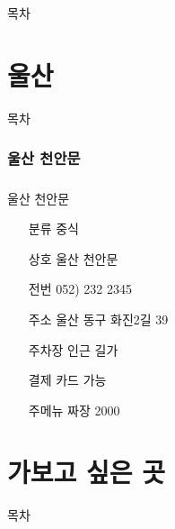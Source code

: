 \documentclass[aspectratio=1610,17pt,xcolor=pdftex,dvipsnames,table,handout]{beamer}
\begin{document}
\label{part3} 	%

		\begin{frame} [plain]{목차}
		\tableofcontents%
		\end{frame}



		\part{ 울산 }
		\frame{\partpage}
		
\label{part4} 	%

		\begin{frame} [plain]{목차}
		\tableofcontents%
		\end{frame}

		\section{ 울산 천안문 }
		\begin{frame} [t,plain]
		\frametitle{ }
			\begin{block} { 울산 천안문 }
			\setlength{\leftmargini}{4em}			
			\begin{itemize}
				\item [분류] 중식
				\item [상호] 울산 천안문
				\item [전번] 052) 232 2345
				\item [주소] 울산 동구 화진2길 39
				\item [주차장]  인근 길가
				\item [결제] 카드 가능
				\item [주메뉴] 짜장 2000
			\end{itemize}
			\end{block}						

		\end{frame}						




		\part{ 가보고 싶은  곳 }
		\frame{\partpage}
		
\label{part5} 	%

		\begin{frame} [plain]{목차}
		\tableofcontents%
		\end{frame}




\end{document}

